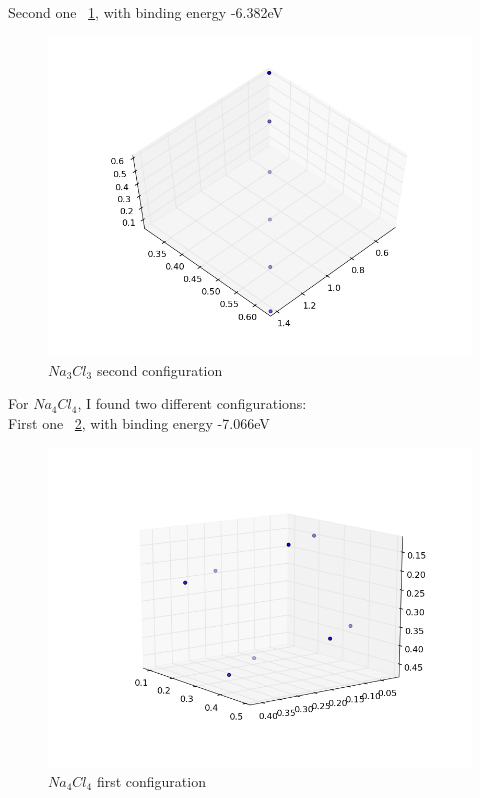 \documentclass[11pt,letterpaper]{article}
\begin{document}
Second one ~\ref{figure3}, with binding energy -6.382eV\\

\begin{figure}
\begin{center}
\includegraphics[width=0.8\linewidth,angle=0]{na3_2.png}
\caption{$Na_3Cl_3$ second configuration}
\label{figure3}
\end{center}
\end{figure}

For $Na_4Cl_4$, I found two different configurations:\\
First one ~\ref{figure4}, with binding energy -7.066eV

\begin{figure}
\begin{center}
\includegraphics[width=0.8\linewidth,angle=0]{na4_1.png}
\caption{$Na_4Cl_4$ first configuration}
\label{figure4}
\end{center}
\end{figure}
\end{document}

